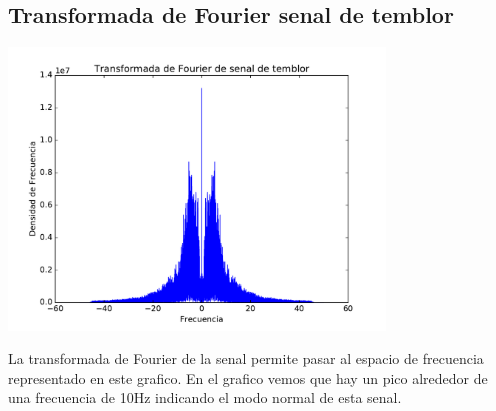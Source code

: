 \documentclass[11pt,letterpaper]{exam}
\begin{document}
\subsection{Transformada de Fourier senal de temblor}
\begin{center}
\includegraphics[width=10cm]{Fourier_temblor.pdf} 
\end{center}
La transformada de Fourier de la senal permite pasar al espacio de frecuencia representado en este grafico. En el grafico vemos que hay un pico alrededor de una frecuencia de 10Hz indicando el modo normal de esta senal.

\end{document}
